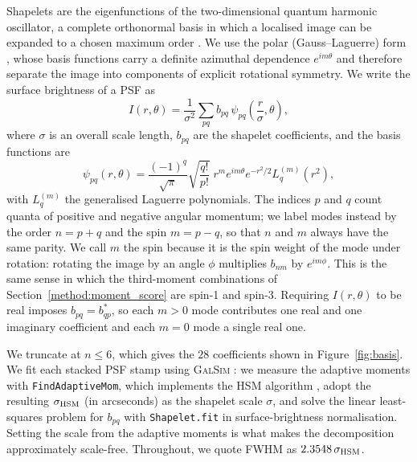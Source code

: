 \documentclass[]{spie}
\begin{document}
Shapelets are the eigenfunctions of the two-dimensional quantum harmonic oscillator, a
complete orthonormal basis in which a localised image can be expanded to a chosen maximum
order \cite{Refregier2003, BernsteinJarvis2002}. We use the polar (Gauss--Laguerre) form
\cite{MasseyRefregier2005}, whose basis functions carry a definite azimuthal dependence
$e^{im\theta}$ and therefore separate the image into components of explicit rotational
symmetry. 
We write the surface brightness of a PSF as
\begin{equation}
I(r, \theta) = \frac{1}{\sigma^2} \sum_{pq} b_{pq}\,
               \psi_{pq}\!\left(\frac{r}{\sigma}, \theta\right),
\label{eq:shapelet}
\end{equation}
where $\sigma$ is an overall scale length, $b_{pq}$ are the shapelet coefficients, and the
basis functions are
\begin{equation}
\psi_{pq}(r, \theta) = \frac{(-1)^q}{\sqrt{\pi}} \sqrt{\frac{q!}{p!}}\;
                       r^{m} e^{im\theta} e^{-r^2/2} L_q^{(m)}(r^2),
\label{eq:basis}
\end{equation}
with $L_q^{(m)}$ the generalised Laguerre polynomials. The indices $p$ and $q$ count quanta
of positive and negative angular momentum; we label modes instead by the order $n = p + q$
and the spin $m = p - q$, so that $n$ and $m$ always have the same parity. We call $m$ the
spin because it is the spin weight of the mode under rotation: rotating the image by an
angle $\phi$ multiplies $b_{nm}$ by $e^{i m \phi}$. This is the same sense in which the
third-moment combinations of Section~\ref{method:moment_score} are spin-1 and spin-3.
Requiring $I(r,\theta)$ to be real imposes $b_{pq} = b_{qp}^{*}$, so each $m > 0$ mode
contributes one real and one imaginary coefficient and each $m = 0$ mode a single real one.

We truncate at $n \le 6$, which gives the $28$ coefficients shown in
Figure~\ref{fig:basis}. We fit each stacked PSF stamp using \textsc{GalSim}
\cite{Rowe2015}: we measure the adaptive moments with \texttt{FindAdaptiveMom}, which
implements the HSM algorithm \cite{HirataSeljak2003}, adopt the resulting
$\sigma_{\rm HSM}$ (in arcseconds) as the shapelet scale $\sigma$, and solve the linear
least-squares problem for $b_{pq}$ with \texttt{Shapelet.fit} in surface-brightness
normalisation. Setting the scale from the adaptive moments is what makes the decomposition
approximately scale-free. Throughout, we quote FWHM as $2.3548\,\sigma_{\rm HSM}$.
\end{document}
